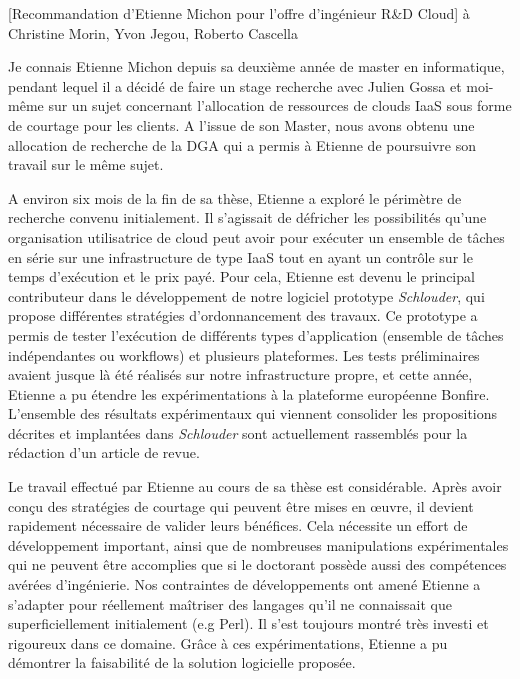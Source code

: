 \documentclass[a4paper,10pt]{article}
\begin{document}

\begin{letter}[Recommandation d'Etienne Michon pour l'offre d'ingénieur R\&D Cloud]
{à}
{Christine Morin, Yvon Jegou, Roberto Cascella}

Je connais  Etienne Michon depuis sa  deuxième année de master  en informatique,
pendant lequel  il a  décidé de faire  un stage recherche  avec Julien  Gossa et
moi-même sur un sujet concernant l'allocation  de ressources de clouds IaaS sous
forme de courtage pour les clients.  A  l'issue de son Master, nous avons obtenu
une allocation de recherche  de la DGA qui a permis à  Etienne de poursuivre son
travail sur le même sujet.

A environ  six mois de  la fin de  sa thèse, Etienne  a exploré le  périmètre de
recherche  convenu initialement.   Il s'agissait  de défricher  les possibilités
qu'une organisation  utilisatrice de  cloud peut
avoir pour  exécuter un ensemble  de tâches en  série sur une  infrastructure de
type IaaS tout en ayant un contrôle sur le
temps d'exécution et  le prix payé.  Pour cela, Etienne  est devenu le principal
contributeur    dans   le    développement   de    notre   logiciel    prototype
\textit{Schlouder},  qui  propose  différentes stratégies  d'ordonnancement  des
travaux.   Ce prototype  a  permis  de tester  l'exécution  de différents  types
d'application  (ensemble  de tâches  indépendantes  ou  workflows) et  plusieurs
plateformes. Les  tests préliminaires avaient  jusque là été réalisés  sur notre
infrastructure propre, et cette année, Etienne a pu étendre les expérimentations
à la plateforme européenne Bonfire.   L'ensemble des résultats expérimentaux qui
viennent   consolider    les   propositions   décrites   et    implantées   dans
\emph{Schlouder} sont actuellement rassemblés pour  la rédaction d'un article de
revue.

\vspace{.6cm}
Le travail  effectué par Etienne au  cours de sa thèse  est considérable.  Après
avoir conçu des  stratégies de courtage qui peuvent être  mises en {\oe}uvre, il
devient rapidement  nécessaire de  valider leurs  bénéfices.  Cela  nécessite un
effort  de  développement  important,  ainsi  que  de  nombreuses  manipulations
expérimentales qui ne peuvent être accomplies  que si le doctorant possède aussi
des  compétences avérées  d'ingénierie.  Nos  contraintes de  développements ont
amené  Etienne a  s'adapter  pour  réellement maîtriser  des  langages qu'il  ne
connaissait  que superficiellement  initialement (e.g  Perl). Il  s'est toujours
montré très investi et rigoureux dans ce domaine.  Grâce à ces expérimentations,
Etienne a pu démontrer la faisabilité de la solution logicielle proposée.


\end{letter}
\end{document}
